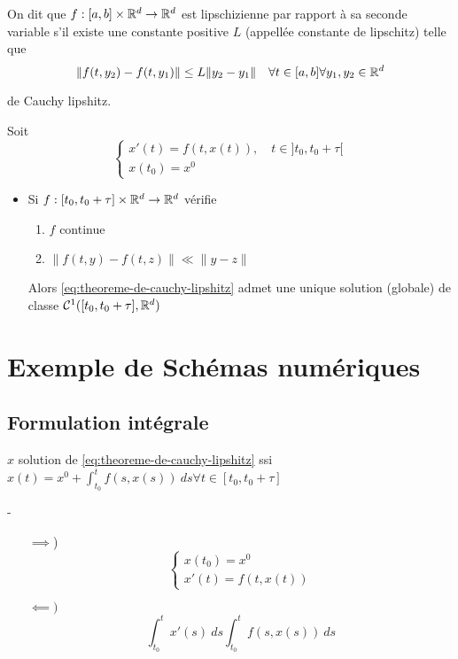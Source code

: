 \begin{definition}
    On dit que $f: [a, b] \times \mathbb{R}^d \to \mathbb{R}^d$  est lipschizienne par rapport à sa seconde variable s'il existe une constante positive $L$ (appellée constante de lipschitz) telle que
    \[
        \|f(t, y_2) - f(t, y_1)\| \le L\|y_2 - y_1\| \quad \forall t \in [a, b] \forall y_1, y_2 \in \mathbb{R}^d
    \] 
\end{definition}
\begin{theorem}
    de Cauchy lipshitz.

    Soit 
    \begin{equation}\label{eq:theoreme-de-cauchy-lipshitz}
        \begin{cases}
            x'(t) = f(t, x(t)), \quad t \in ]t_0, t_0 + \tau[\\
            x(t_0) = x^0
        \end{cases}
    \end{equation}
    \begin{itemize}
        \item Si $f: [t_0, t_0 + \tau] \times \mathbb{R}^d \to \mathbb{R}^d$ vérifie 
            \begin{enumerate}
                \item $f$ continue
                \item  $\|f(t, y) - f(t, z)\| \ll \|y - z\|$
            \end{enumerate}
            Alors \ref{eq:theoreme-de-cauchy-lipshitz} admet une unique solution (globale) de classe $\mathcal{C}^1([t_0, t_0+\tau], \mathbb{R}^d)$
    \end{itemize}
\end{theorem}
\section{Exemple de Schémas numériques}
\subsection{Formulation intégrale}
\begin{prop}
    $x$ solution de \ref{eq:theoreme-de-cauchy-lipshitz} ssi $x(t) = x^0 + \int_{{t_0}}^{{t}} {f(s, x(s))} \: d{s} {\forall t \in [t_0, t_0 + \tau]}$
\end{prop}
\begin{preuve}
   - 
   \begin{itemize}
       \item[$\implies$)] 
           \[
           \begin{cases}
               x(t_0) = x^0\\
               x'(t) = f(t, x(t))
           \end{cases}
           \] 
       \item[$\impliedby)$]
           \[
           \int_{{t_0}}^{{t}} {x'(s)} \: d{s} {\int_{{t_0}}^{{t}} {f(s, x(s))} \: d{s} {}}
           \] 
   \end{itemize}
\end{preuve}
